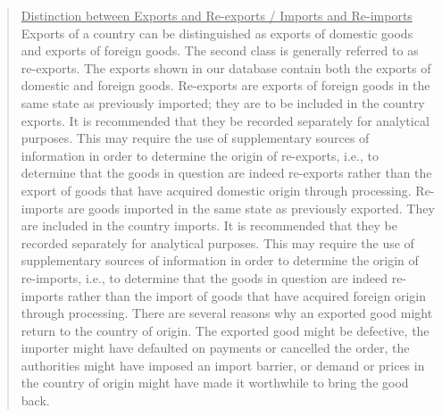 \documentclass[nojss]{jss}\usepackage[]{graphicx}\usepackage[]{color}
\begin{document}
\begin{quote}
\underline{Distinction between Exports and Re-exports / Imports and Re-imports}\\
Exports of a country can be distinguished as exports of domestic goods and exports of foreign goods. The second class is generally referred to as re-exports. The exports shown in our database contain both the exports of domestic and foreign goods. Re-exports are exports of foreign goods in the same state as previously imported; they are to be included in the country exports. It is recommended that they be recorded separately for analytical purposes. This may require the use of supplementary sources of information in order to determine the origin of re-exports, i.e., to determine that the goods in question are indeed re-exports rather than the export of goods that have acquired domestic origin through processing. Re-imports are goods imported in the same state as previously exported. They are included in the country imports. It is recommended that they be recorded separately for analytical purposes. This may require the use of supplementary sources of information in order to determine the origin of re-imports, i.e., to determine that the goods in question are indeed re-imports rather than the import of goods that have acquired foreign origin through processing. There are several reasons why an exported good might return to the country of origin. The exported good might be defective, the importer might have defaulted on payments or cancelled the order, the authorities might have imposed an import barrier, or demand or prices in the country of origin might have made it worthwhile to bring the good back.
\end{quote}
\end{document}

